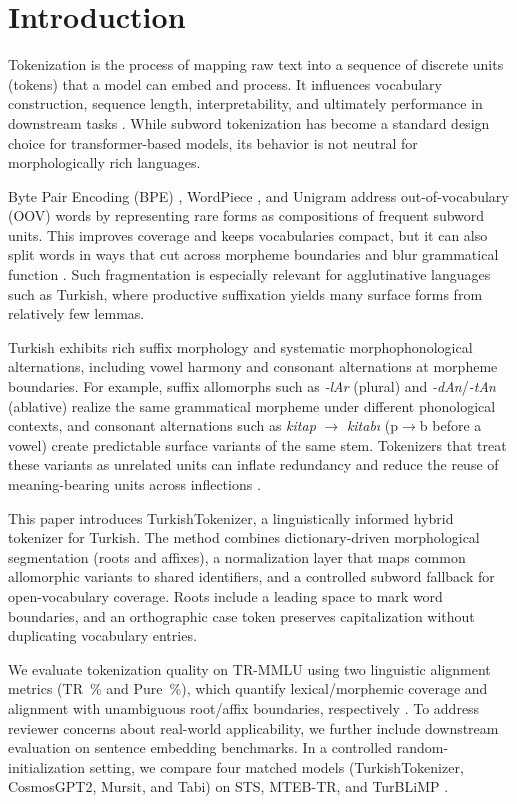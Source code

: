 \section{Introduction}
Tokenization is the process of mapping raw text into a sequence of discrete units (tokens) that a model can embed and process. It influences vocabulary construction, sequence length, interpretability, and ultimately performance in downstream tasks \cite{liu_roberta_2019}. While subword tokenization has become a standard design choice for transformer-based models, its behavior is not neutral for morphologically rich languages.

Byte Pair Encoding (BPE) \cite{sennrich_neural_2016}, WordPiece \cite{schuster_japanese_2012}, and Unigram \cite{kudo_sentencepiece_2018} address out-of-vocabulary (OOV) words by representing rare forms as compositions of frequent subword units. This improves coverage and keeps vocabularies compact, but it can also split words in ways that cut across morpheme boundaries and blur grammatical function \cite{toraman_impact_2023, kaya_effect_2024}. Such fragmentation is especially relevant for agglutinative languages such as Turkish, where productive suffixation yields many surface forms from relatively few lemmas.

Turkish exhibits rich suffix morphology and systematic morphophonological alternations, including vowel harmony and consonant alternations at morpheme boundaries. For example, suffix allomorphs such as \textit{-lAr} (plural) and \textit{-dAn}/\textit{-tAn} (ablative) realize the same grammatical morpheme under different phonological contexts, and consonant alternations such as \textit{kitap} $\rightarrow$ \textit{kitabı} (p$\rightarrow$b before a vowel) create predictable surface variants of the same stem. Tokenizers that treat these variants as unrelated units can inflate redundancy and reduce the reuse of meaning-bearing units across inflections \cite{bayram_tokenization_2025}.

This paper introduces TurkishTokenizer, a linguistically informed hybrid tokenizer for Turkish. The method combines dictionary-driven morphological segmentation (roots and affixes), a normalization layer that maps common allomorphic variants to shared identifiers, and a controlled subword fallback for open-vocabulary coverage. Roots include a leading space to mark word boundaries, and an orthographic case token preserves capitalization without duplicating vocabulary entries.

We evaluate tokenization quality on TR-MMLU \cite{bayram_setting_2025} using two linguistic alignment metrics (TR~\% and Pure~\%), which quantify lexical/morphemic coverage and alignment with unambiguous root/affix boundaries, respectively \cite{bayram_tokenization_2025}. To address reviewer concerns about real-world applicability, we further include downstream evaluation on sentence embedding benchmarks. In a controlled random-initialization setting, we compare four matched models (TurkishTokenizer, CosmosGPT2, Mursit, and Tabi) on STS, MTEB-TR, and TurBLiMP \cite{basar_turblimp_2025}.

